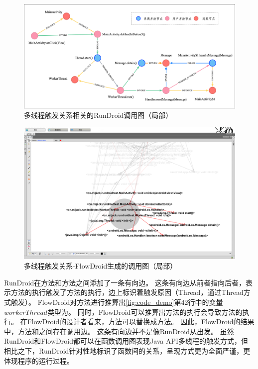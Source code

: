 \begin{figure}[ht]
	\centering
	\includegraphics[width=\textwidth]{./Figures/android-handler-rundroid.png}
	\caption{多线程触发关系相关的RunDroid调用图（局部）}
	\label{fig:rundroid-result-handler}
\end{figure}



\begin{figure}[ht]
	\centering
	\includegraphics[width=\textwidth]{./Figures/FlowDroid-handler.png}
	\caption{多线程触发关系-FlowDroid生成的调用图（局部）}
	\label{fig:flowdroid-result-handler}
\end{figure}





RunDroid在方法和方法之间添加了一条有向边。
这条有向边从前者指向后者，表示方法的执行触发了方法的执行，边上标识着触发原因（Thread，通过Thread方式触发）。
FlowDroid对方法进行推算出\autoref{fig:code_demo}第42行中的变量$workerThread$类型为。
同时，FlowDroid可以推算出方法的执行会导致方法的执行。
在FlowDroid的设计者看来，方法可以替换成方法。
因此，FlowDroid的结果中，方法和之间存在调用边。
这条有向边并不是像RunDroid从出发。
虽然RunDroid和FlowDroid都可以在函数调用图表现Java API多线程的触发方式，但相比之下，RunDroid针对性地标识了函数间的关系，呈现方式更为全面严谨，更体现程序的运行过程。



